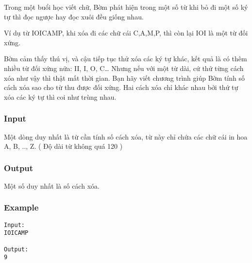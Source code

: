 



   Trong một buổi học viết chữ, Bờm phát hiện trong một số từ khi bỏ đi một số ký tự thì đọc ngược hay đọc xuôi đều giống nhau.  

   Ví dụ từ IOICAMP, khi xóa đi các chữ cái C,A,M,P, thì còn lại IOI là một từ đối xứng.  

   Bờm cảm thấy thú vị, và cậu tiếp tục thử xóa các ký tự khác, kết quả là có thêm nhiều từ đối xứng nữa: II, I, O, C… Nhưng nếu với một từ dài, cứ thử từng cách xóa như vậy thì thật mất thời gian. Bạn hãy viết chương trình giúp Bờm tính số cách xóa sao cho từ thu được đối xứng. Hai cách xóa chỉ khác nhau bởi thứ tự xóa các ký tự thì coi như trùng nhau.  

\subsubsection{   Input  }

   Một dòng duy nhất là từ cần tính số cách xóa, từ này chỉ chứa các chữ cái in hoa A, B, .., Z. ( Độ dài từ không quá 120 )  

\subsubsection{   Output  }

   Một số duy nhất là số cách xóa.  

\subsubsection{   Example  }
\begin{verbatim}
Input:
IOICAMP

Output:
9
\end{verbatim}